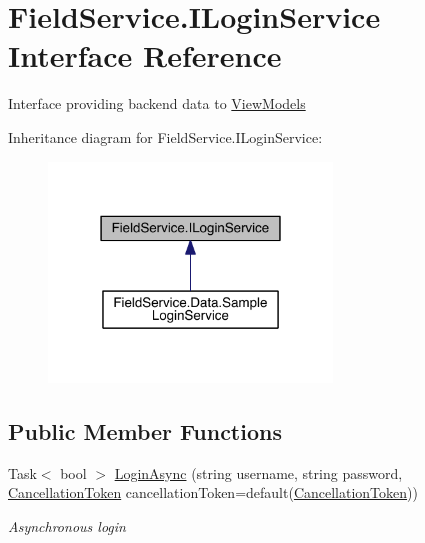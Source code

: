 \hypertarget{interface_field_service_1_1_i_login_service}{\section{Field\+Service.\+I\+Login\+Service Interface Reference}
\label{interface_field_service_1_1_i_login_service}
}


Interface providing backend data to \hyperlink{namespace_field_service_1_1_view_models}{View\+Models}  




Inheritance diagram for Field\+Service.\+I\+Login\+Service\+:
\nopagebreak
\begin{figure}[H]
\begin{center}
\leavevmode
\includegraphics[width=214pt]{interface_field_service_1_1_i_login_service__inherit__graph}
\end{center}
\end{figure}
\subsection*{Public Member Functions}
\begin{DoxyCompactItemize}
\item 
Task$<$ bool $>$ \hyperlink{interface_field_service_1_1_i_login_service_a1e82d7033555800002f016ddb020f6df}{Login\+Async} (string username, string password, \hyperlink{_view_models_2_assignment_view_model_8cs_aba80ec766846c61f55644fd23860cb18}{Cancellation\+Token} cancellation\+Token=default(\hyperlink{_view_models_2_assignment_view_model_8cs_aba80ec766846c61f55644fd23860cb18}{Cancellation\+Token}))
\begin{DoxyCompactList}\small\item\em Asynchronous login \end{DoxyCompactList}\end{DoxyCompactItemize}


